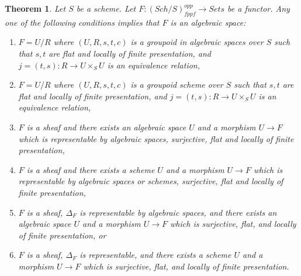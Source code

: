 \documentclass[10pt,a4paper]{amsart}
\theoremstyle{plain}
\newtheorem{theorem}[subsection]{Theorem}
\theoremstyle{definition}
\theoremstyle{remark}
\numberwithin{equation}{subsection}
\def\Sch{\mathit{Sch}}
\begin{document}
\begin{theorem}
\label{theorem-final-bootstrap}
Let $S$ be a scheme.
Let $F : (\Sch/S)_{fppf}^{opp} \to \textit{Sets}$ be a functor.
Any one of the following conditions implies that $F$ is an algebraic space:
\begin{enumerate}
\item $F = U/R$ where $(U, R, s, t, c)$ is a groupoid in algebraic spaces
over $S$ such that $s, t$ are flat and locally of finite presentation, and
$j = (t, s) : R \to U \times_S U$ is an equivalence relation,
\item $F = U/R$ where $(U, R, s, t, c)$ is a groupoid scheme
over $S$ such that $s, t$ are flat and locally of finite presentation, and
$j = (t, s) : R \to U \times_S U$ is an equivalence relation,
\item $F$ is a sheaf and there exists an algebraic space $U$ and a morphism
$U \to F$ which is representable by algebraic spaces,
surjective, flat and locally of finite presentation,
\item $F$ is a sheaf and there exists a scheme $U$ and a morphism
$U \to F$ which is representable by algebraic spaces or schemes,
surjective, flat and locally of finite presentation,
\item $F$ is a sheaf, $\Delta_F$ is representable by algebraic spaces,
and there exists an algebraic space $U$ and a morphism $U \to F$ which is
surjective, flat, and locally of finite presentation, or
\item $F$ is a sheaf, $\Delta_F$ is representable,
and there exists a scheme $U$ and a morphism $U \to F$ which is
surjective, flat, and locally of finite presentation.
\end{enumerate}
\end{theorem}
\end{document}
